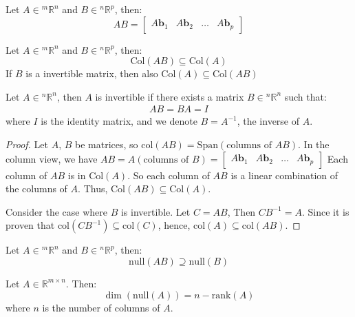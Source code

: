 \documentclass[11pt]{article}
\begin{document}
\begin{definition}
    Let $A \in {^m\mathbb{R}^n}$ and $B \in {^n\mathbb{R}^p}$, then:
    \begin{equation}
        AB = \begin{bmatrix} A\textbf{b}_1 & A\textbf{b}_2 & \ldots & A\textbf{b}_p \end{bmatrix}
    \end{equation}
\end{definition}
\begin{theorem}
    Let $A \in {^m\mathbb{R}^n}$ and $B \in {^n\mathbb{R}^p}$, then:
    \begin{equation}
        \text{Col}(AB) \subseteq \text{Col}(A)
    \end{equation}
    If $B$ is a invertible matrix, then also $\text{Col}(A) \subseteq \text{Col}(AB)$
\end{theorem}
\begin{definition}[Invertible]
    Let $A \in {^n\mathbb{R}^n}$, then $A$ is invertible if there exists a matrix $B \in {^n\mathbb{R}^n}$ such that:
    \begin{align}
        AB = BA = I
    \end{align}
    where $I$ is the identity matrix, and we denote $B = A^{-1}$, the inverse of $A$.
\end{definition}
\begin{proof}
    Let $A$, $B$ be matrices, so $\text{col}(AB) = \text{Span}(\text{columns of }AB)$. In the column view, we have $AB = A(\text{columns of }B) = \begin{bmatrix}
        A\textbf{b}_1 & A\textbf{b}_2 & \ldots & A\textbf{b}_p
    \end{bmatrix}$
    Each column of $AB$ is in $\text{Col}(A)$. So each column of $AB$ is a linear combination of the columns of $A$. Thus, $\text{Col}(AB) \subseteq \text{Col}(A)$.

    Consider the case where $B$ is invertible. Let $C = AB$, Then $CB^{-1} = A$. Since it is proven that $\text{col}(CB^{-1}) \subseteq \text{col}(C)$, hence,  $\text{col}(A) \subseteq \text{col}(AB)$.
\end{proof}
\begin{definition}
    Let $A \in {^m\mathbb{R}^n}$ and $B \in {^n\mathbb{R}^p}$, then:
    \begin{equation}
        \text{null}(AB) \supseteq \text{null}(B)
    \end{equation}
\end{definition}
\begin{definition}
    Let $A \in \mathbb{R}^{m \times n}$. Then:
    \begin{equation}
        \dim(\text{null}(A)) = n - \text{rank}(A)
    \end{equation}
    where $n$ is the number of columns of $A$.
\end{definition}
\end{document}
